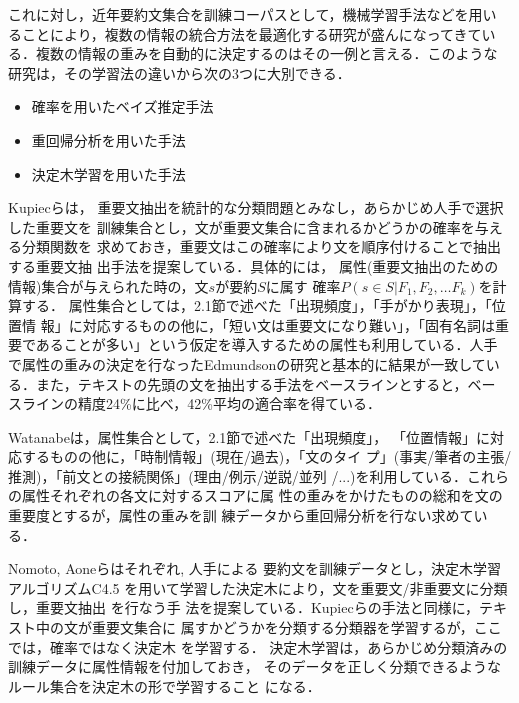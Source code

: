 これに対し，近年要約文集合を訓練コーパスとして，機械学習手法などを用い
ることにより，複数の情報の統合方法を最適化する研究が盛んになってきてい
る．複数の情報の重みを自動的に決定するのはその一例と言える．このような
研究は，その学習法の違いから次の3つに大別できる．

\newpage
\begin{itemize}
\item 確率を用いたベイズ推定手法
\cite{kupiec:95:a,jang:97:a,teufel:97:a}
\item 重回帰分析を用いた手法\cite{watanabe:96:a}
\item 決定木学習を用いた手法\cite{nomoto:97:a,aone:97:a}
\end{itemize}

Kupiecら\cite{kupiec:95:a}は，
重要文抽出を統計的な分類問題とみなし，あらかじめ人手で選択した重要文を
訓練集合とし，文が重要文集合に含まれるかどうかの確率を与える分類関数を
求めておき，重要文はこの確率により文を順序付けることで抽出する重要文抽
出手法を提案している．具体的には，
属性(重要文抽出のための情報)集合が与えられた時の，文$s$が要約$S$に属す
確率$P(s \in S | F_1, F_2, \ldots F_k)$を計算する．
属性集合としては，2.1節で述べた「出現頻度」，「手がかり表現」，「位置情
報」に対応するものの他に，「短い文は重要文になり難い」，「固有名詞は重
要であることが多い」という仮定を導入するための属性も利用している．人手
で属性の重みの決定を行なったEdmundsonの研究と基本的に結果が一致してい
る．また，テキストの先頭の文を抽出する手法をベースラインとすると，ベー
スラインの精度24\%に比べ，42\%平均の適合率を得ている．

Watanabe\cite{watanabe:96:a}は，属性集合として，2.1節で述べた「出現頻度」，
「位置情報」に対応するものの他に，「時制情報」(現在/過去)，「文のタイ
プ」(事実/筆者の主張/推測)，「前文との接続関係」(理由/例示/逆説/並列
/...)を利用している．これらの属性それぞれの各文に対するスコアに属
性の重みをかけたものの総和を文の重要度とするが，属性の重みを訓
練データから重回帰分析を行ない求めている．

Nomoto\cite{nomoto:97:a}, Aoneら\cite{aone:97:a}はそれぞれ, 人手による
要約文を訓練データとし，決定木学習アルゴリズムC4.5\cite{quinlan:93:a}
を用いて学習した決定木により，文を重要文/非重要文に分類し，重要文抽出
を行なう手
法を提案している．Kupiecらの手法と同様に，テキスト中の文が重要文集合に
属すかどうかを分類する分類器を学習するが，ここでは，確率ではなく決定木
を学習する．
決定木学習は，あらかじめ分類済みの訓練データに属性情報を付加しておき，
そのデータを正しく分類できるようなルール集合を決定木の形で学習すること
になる．

